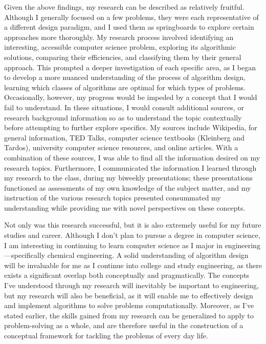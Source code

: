 \documentclass{article}
\begin{document}
Given the above findings, my research can be described as relatively fruitful. Although I generally focused on a few problems, they were each representative of a different design paradigm, and I used them as springboards to explore certain approaches more thoroughly. My research process involved identifying an interesting, accessible computer science problem, exploring its algorithmic solutions, comparing their efficiencies, and classifying them by their general approach. This prompted a deeper investigation of each specific area, as I began to develop a more nuanced understanding of the process of algorithm design, learning which classes of algorithms are optimal for which types of problems. Occasionally, however, my progress would be impeded by a concept that I would fail to understand. In these situations, I would consult additional sources, or research background information so as to understand the topic contextually before attempting to further explore specifics. My sources include Wikipedia, for general information, TED Talks, computer science textbooks (Kleinberg and Tardos), university computer science resources, and online articles. With a combination of these sources, I was able to find all the information desired on my research topics. Furthermore, I communicated the information I learned through my research to the class, during my biweekly presentations; these presentations functioned as assessments of my own knowledge of the subject matter, and my instruction of the various research topics presented consummated my understanding while providing me with novel perspectives on these concepts.

Not only was this research successful, but it is also extremely useful for my future studies and career. Although I don’t plan to pursue a degree in computer science, I am interesting in continuing to learn computer science as I major in engineering—specifically chemical engineering. A solid understanding of algorithm design will be invaluable for me as I continue into college and study engineering, as there exists a significant overlap both conceptually and pragmatically. The concepts I’ve understood through my research will inevitably be important to engineering, but my research will also be beneficial, as it will enable me to effectively design and implement algorithms to solve problems computationally. Moreover, as I’ve stated earlier, the skills gained from my research can be generalized to apply to problem-solving as a whole, and are therefore useful in the construction of a conceptual framework for tackling the problems of every day life.
\end{document}
